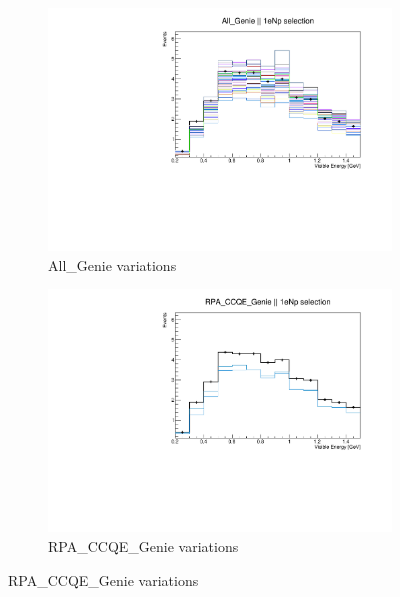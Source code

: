 \documentclass[a4paper]{article}
\begin{document}
\begin{figure}[ht] 
\begin{center}
    \begin{subfigure}[b]{0.33\textwidth}
    \centering
    \includegraphics[width=1.00\textwidth]{systvariations/Variation_nue_reco_e_genietune_run1_genieonly_All_Genie_nu_uBooNE_nue_intrinsic.pdf}
    \caption{\label{fig:genievarsallgenie}All\_Genie variations}
    \end{subfigure}
    \begin{subfigure}[b]{0.33\textwidth}
    \centering
    \includegraphics[width=1.00\textwidth]{systvariations/Variation_nue_reco_e_genietune_run1_genieonly_RPA_CCQE_Genie_nu_uBooNE_nue_intrinsic.pdf}
    \caption{\label{fig:genievarsRPA}RPA\_CCQE\_Genie variations}
    \end{subfigure}

\end{center}
\end{figure}
\end{document}
